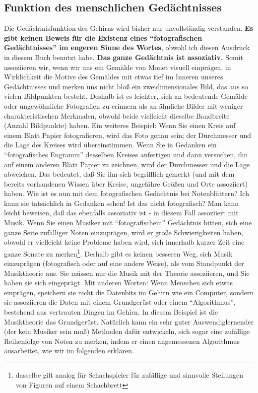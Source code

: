 
\subsection{Funktion des menschlichen Gedächtnisses}\hypertarget{c1iii6m}{}

Die Gedächtnisfunktion des Gehirns wird bisher nur unvollständig verstanden.
\textbf{Es gibt keinen Beweis für die Existenz eines \enquote{fotografischen Gedächtnisses} im engeren Sinne des Wortes}, obwohl ich diesen Ausdruck in diesem Buch benutzt habe.
\textbf{Das ganze Gedächtnis ist assoziativ.}
Somit assoziieren wir, wenn wir uns ein Gemälde von Monet visuell einprägen, in Wirklichkeit die Motive des Gemäldes mit etwas tief im Inneren unseres Gedächtnisses und merken uns nicht bloß ein zweidimensionales Bild, das aus so vielen Bildpunkten besteht.
Deshalb ist es leichter, sich an bedeutende Gemälde oder ungewöhnliche Fotografien zu erinnern als an ähnliche Bilder mit weniger charakteristischen Merkmalen, obwohl beide vielleicht dieselbe Bandbreite (Anzahl Bildpunkte) haben.
Ein weiteres Beispiel: Wenn Sie einen Kreis auf einem Blatt Papier fotografieren, wird das Foto genau sein; der Durchmesser und die Lage des Kreises wird übereinstimmen.
Wenn Sie in Gedanken ein \enquote{fotografisches Engramm} desselben Kreises anfertigen und dann versuchen, ihn auf einem anderen Blatt Papier zu zeichnen, wird der Durchmesser und die Lage abweichen.
Das bedeutet, daß Sie ihn sich begrifflich gemerkt (und mit dem bereits vorhandenen Wissen über Kreise, ungefähre Größen und Orte assoziiert) haben.
Wie ist es nun mit dem fotografischen Gedächtnis bei Notenblättern?
Ich kann sie tatsächlich in Gedanken sehen!
Ist das nicht fotografisch?
Man kann leicht beweisen, daß das ebenfalls assoziativ ist - in diesem Fall assoziiert mit Musik.
Wenn Sie einen Musiker mit \enquote{fotografischem} Gedächtnis bitten, sich eine ganze Seite zufälliger Noten einzuprägen, wird er große Schwierigkeiten haben, obwohl er vielleicht keine Probleme haben wird, sich innerhalb kurzer Zeit eine ganze Sonate zu merken\footnote{dasselbe gilt analog für Schachspieler für zufällige und sinnvolle Stellungen von Figuren auf einem Schachbrett}.
Deshalb gibt es keinen besseren Weg, sich Musik einzuprägen (fotografisch oder auf eine andere Weise), als vom Standpunkt der Musiktheorie aus.
Sie müssen nur die Musik mit der Theorie assoziieren, und Sie haben sie sich eingeprägt.
Mit anderen Worten: Wenn Menschen sich etwas einprägen, speichern sie nicht die Datenbits im Gehirn wie ein Computer, sondern sie assoziieren die Daten mit einem Grundgerüst oder einem \enquote{Algorithmus}, bestehend aus vertrauten Dingen im Gehirn.
In diesem Beispiel ist die Musiktheorie das Grundgerüst.
Natürlich kann ein sehr guter Auswendiglernender (der kein Musiker sein muß) Methoden dafür entwickeln, sich sogar eine zufällige Reihenfolge von Noten zu merken, indem er einen angemessenen Algorithmus ausarbeitet, wie wir im folgenden erklären.

